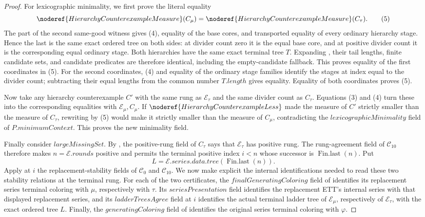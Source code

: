 \begin{proof}
For lexicographic minimality, we first prove the literal equality
\[
 \noderef{HierarchyCounterexampleMeasure}(C_\mu)
   =\noderef{HierarchyCounterexampleMeasure}(C_\tau).          \tag{5}
\]
The  part of the second same-good witness
gives (4), equality of the base cores, and transported equality of every
ordinary hierarchy stage.  Hence the last
 is the same exact ordered tree on both
sides: at divider count zero it is the equal base core, and at positive
divider count it is the corresponding equal ordinary stage.  Both
hierarchies have the same exact terminal tree \(T\).  Expanding
, their tail lengths, finite candidate sets,
and candidate predicates are therefore identical, including the
empty-candidate fallback.  This proves equality of the first coordinates
in (5).  For the second coordinates, (4) and equality of the ordinary
stage families identify the stages at index equal to the divider count;
subtracting their equal lengths from the common number
\(T.\mathit{length}\) gives equality.  Equality of both coordinates
proves (5).

Now take any hierarchy counterexample \(C'\) with the same rung as
\(\mathcal E_\tau\) and the same divider count as \(C_\tau\).  Equations
(3) and (4) turn these into the corresponding equalities with
\(\mathcal E_\mu,C_\mu\).  If
\(\noderef{HierarchyCounterexampleLess}\) made the measure of \(C'\)
strictly smaller than the measure of \(C_\tau\), rewriting by (5) would
make it strictly smaller than the measure of \(C_\mu\), contradicting
the \(\mathit{lexicographicMinimality}\) field of
\(P.\mathit{minimumContext}\).  This proves the new minimality field.

Finally consider \(\mathit{largeMissingSet}\).  By
, the positive-rung field of \(C_\tau\)
says that \(\mathcal E_\tau\) has positive rung.  The rung-agreement field
of \(\mathcal C_{10}\) therefore makes
\(n=\mathcal E.\mathit{rounds}\) positive and permits the terminal positive
index \(i<n\) whose successor is \(\operatorname{Fin.last}(n)\).  Put
\[
 L=\mathcal E.\mathit{series}.\mathit{data}.\mathit{tree}
       (\operatorname{Fin.last}(n)).
\]
Apply at \(i\) the replacement-stability fields of \(\mathcal C_0\) and
\(\mathcal C_{10}\).  We now make explicit the internal identifications
needed to read these two stability relations at the terminal rung.  For
each of the two certificates, the
\(\mathit{finalGeneratingColoring}\) field of
 identifies its replacement
series terminal coloring with \(\mu\), respectively with \(\tau\).  Its
\(\mathit{seriesPresentation}\) field identifies the replacement ETT's
internal series with that displayed replacement series, and its
\(\mathit{ladderTreesAgree}\) field at \(i\) identifies the actual terminal
ladder tree of \(\mathcal E_\mu\), respectively of \(\mathcal E_\tau\),
with the exact ordered tree \(L\).  Finally, the
\(\mathit{generatingColoring}\) field of
 identifies the original series terminal
coloring with \(\varphi\).


\end{proof}
